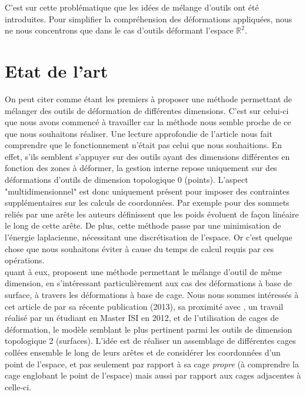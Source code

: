 C'est sur cette problématique que les idées de mélange d'outils ont
été introduites. Pour simplifier la compréhension des déformations
appliquées, nous ne nous concentrons que dans le cas d'outils
déformant l'espace $\mathbb{R}^2$.

\section{Etat de l'art}

On peut citer \cite{JBPS11} comme étant les premiers à proposer une
méthode permettant de mélanger des outils de déformation de
différentes dimensions. C'est sur celui-ci que nous avons commencé à
travailler car la méthode nous semble proche de ce que nous souhaitons
réaliser. Une lecture approfondie de l'article nous fait comprendre
que le fonctionnement n'était pas celui que nous souhaitions. En
effet, s'ils semblent s'appuyer sur des outils ayant des dimensions
différentes en fonction des zones à déformer, la gestion interne
repose uniquement sur des déformations d'outils de dimension
topologique 0 (points). L'aspect "multidimensionnel" est donc
uniquement présent pour imposer des contraintes supplémentaires sur
les calculs de coordonnées. Par exemple pour des sommets reliés par
une arête les auteurs définissent que les poids évoluent de façon
linéaire le long de cette arête. De plus, cette méthode passe par une
minimisation de l'énergie laplacienne, nécessitant une discrétisation
de l'espace. Or c'est quelque chose que nous souhaitons éviter à cause
du temps de calcul requis par ces opérations.
\\

\cite{GPCP13} quant à eux, proposent une méthode permettant le mélange
d'outil de même dimension, en s'intéressant particulièrement aux cas
des déformations à base de surface, à travers les déformations à base
de cage.  Nous nous sommes intéressés à cet article de par sa récente
publication (2013), sa proximité avec \cite{Hur12}, un travail réalisé
par un étudiant en Master ISI en 2012, et de l'utilisation de cages de
déformation, le modèle semblant le plus pertinent parmi les outils de
dimension topologique 2 (surfaces). L'idée est de réaliser un
assemblage de différentes cages collées ensemble le long de leurs
arêtes et de considérer les coordonnées d'un point de l'espace, et pas
seulement par rapport à sa cage \textit{propre} (à comprendre la cage
englobant le point de l'espace) mais aussi par rapport aux cages
adjacentes à celle-ci.

